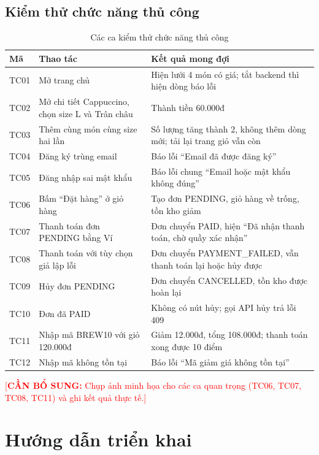 \documentclass[a4paper]{article}
\newcommand{\chen}[1]{\textcolor{red}{[\textbf{CẦN BỔ SUNG:} #1]}}
\begin{document}
\subsection{Kiểm thử chức năng thủ công}
\begin{table}[h!]
\centering
\footnotesize
\begin{tabularx}{\textwidth}{|l|X|X|}
\hline
\textbf{Mã} & \textbf{Thao tác} & \textbf{Kết quả mong đợi} \\ \hline
TC01 & Mở trang chủ & Hiện lưới 4 món có giá; tắt backend thì hiện dòng báo lỗi \\ \hline
TC02 & Mở chi tiết Cappuccino, chọn size L và Trân châu & Thành tiền 60.000đ \\ \hline
TC03 & Thêm cùng món cùng size hai lần & Số lượng tăng thành 2, không thêm dòng mới; tải lại trang giỏ vẫn còn \\ \hline
TC04 & Đăng ký trùng email & Báo lỗi ``Email đã được đăng ký'' \\ \hline
TC05 & Đăng nhập sai mật khẩu & Báo lỗi chung ``Email hoặc mật khẩu không đúng'' \\ \hline
TC06 & Bấm ``Đặt hàng'' ở giỏ hàng & Tạo đơn PENDING, giỏ hàng về trống, tồn kho giảm \\ \hline
TC07 & Thanh toán đơn PENDING bằng Ví & Đơn chuyển PAID, hiện ``Đã nhận thanh toán, chờ quầy xác nhận'' \\ \hline
TC08 & Thanh toán với tùy chọn giả lập lỗi & Đơn chuyển PAYMENT\_FAILED, vẫn thanh toán lại hoặc hủy được \\ \hline
TC09 & Hủy đơn PENDING & Đơn chuyển CANCELLED, tồn kho được hoàn lại \\ \hline
TC10 & Đơn đã PAID & Không có nút hủy; gọi API hủy trả lỗi 409 \\ \hline
TC11 & Nhập mã BREW10 với giỏ 120.000đ & Giảm 12.000đ, tổng 108.000đ; thanh toán xong được 10 điểm \\ \hline
TC12 & Nhập mã không tồn tại & Báo lỗi ``Mã giảm giá không tồn tại'' \\ \hline
\end{tabularx}
\caption{Các ca kiểm thử chức năng thủ công}
\end{table}

\chen{Chụp ảnh minh họa cho các ca quan trọng (TC06, TC07, TC08, TC11) và ghi kết quả thực tế.}

\newpage
\section{Hướng dẫn triển khai}
\end{document}
